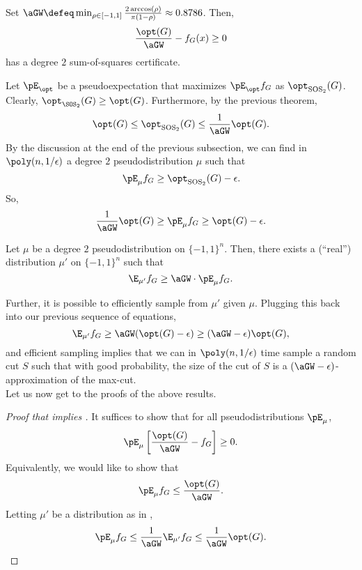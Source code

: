 	\begin{ftheo}
		\label{theo: gw-sos}
		Set $\aGW \defeq \min_{\rho \in [-1,1]} \frac{2\arccos(\rho)}{\pi(1-\rho)} \approx 0.8786$. Then,
		\[ \frac{\opt(G)}{\aGW} - f_G(x) \ge 0 \]
		has a degree $2$ sum-of-squares certificate.
	\end{ftheo}

	Let $\pE_\opt$ be a pseudoexpectation that maximizes $\pE_\opt f_G$ as $\opt_{\text{SOS}_2}(G)$. Clearly, $\opt_{\SOS_2}(G) \ge \opt(G)$. Furthermore, by the previous theorem,
	\[ \opt(G) \le \opt_{\text{SOS}_2}(G) \le \frac{1}{\aGW} \opt(G). \]
	By the discussion at the end of the previous subsection, we can find in $\poly(n,1/\epsilon)$ a degree $2$ pseudodistribution $\mu$ such that
	\[ \pE_\mu f_G \ge \opt_{\text{SOS}_2}(G) - \epsilon. \]
	So,
	\[ \frac{1}{\aGW} \opt(G) \ge \pE_\mu f_G \ge \opt(G) - \epsilon. \]

	\begin{flem}
		\label{lem: gw-pd-to-rd}
		Let $\mu$ be a degree $2$ pseudodistribution on $\{-1,1\}^n$. Then, there exists a (``real'') distribution $\mu'$ on $\{-1,1\}^n$ such that
		\[ \E_{\mu'} f_G \ge \aGW \cdot \pE_{\mu} f_G. \]
	\end{flem}
	Further, it is possible to efficiently sample from $\mu'$ given $\mu$. Plugging this back into our previous sequence of equations,
	\[ \E_{\mu'} f_G \ge \aGW(\opt(G) - \epsilon) \ge (\aGW - \epsilon) \opt(G), \]
	and efficient sampling implies that we can in $\poly(n,1/\epsilon)$ time sample a random cut $S$ such that with good probability, the size of the cut of $S$ is a $(\aGW-\epsilon)$-approximation of the max-cut.\\
	Let us now get to the proofs of the above results.

	\begin{proof}[Proof that  implies ]
		It suffices to show that for all pseudodistributions $\pE_\mu$,
		\[ \pE_\mu \left[ \frac{\opt(G)}{\aGW} - f_G \right] \ge 0. \]
		Equivalently, we would like to show that
		\[ \pE_\mu f_G \le \frac{\opt(G)}{\aGW}. \]
		Letting $\mu'$ be a distribution as in ,
		\[ \pE_\mu f_G \le \frac{1}{\aGW} \E_{\mu'} f_G \le \frac{1}{\aGW} \opt(G). \qedhere \]
	\end{proof}

